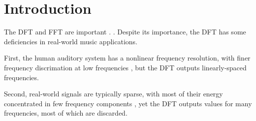 \documentclass[letter,12pt,notitlepage]{article}
\title{\ThesisTitle}
\author{\vspace{1em}\\Sevag Hanssian \\
  McGill University \\
 \small{\texttt{sevag.hanssian@mail.mcgill.ca}} \\
 \small{\texttt{sevagh@protonmail.com}} \\\ \\\ \\
 \small{Thesis for Master of Arts in Music Technology}\\
 \small{Date TBD, 2021}}
\date{}
\begin{document}
\maketitle

\vspace{3.5em}

\begin{abstract}
	The discrete Fourier transform (DFT), and the Fast Fourier Transform (FFT) algorithm for its efficient computation, rank among the most important algorithms in applied engineering and computer science in the modern world. The FFT is used in digital signal processing applications such as audio, seismology, and medical imaging to decompose a signal into a sum of its frequency components. This thesis first describes the DFT and FFT, their use in music systems, and several variants which may be beneficial for music applications. Next, a new software library is proposed which implements the FFT variants with an interface designed to be a drop-in replacement of the standard FFT. Finally, the variants are substituted in two recent state-of-the-art music systems, showing reduced computational footprint and an improvement in accuracy.
\end{abstract}

\vfill
\clearpage %

\tableofcontents

\vfill
\clearpage %

\listoffigures

\listoflistings

\vfill
\clearpage %

\section{Introduction}
\label{sec:intro}


The DFT and FFT \cite{cooleytukey} are important \cite{dftimportant}. . Despite its importance, the DFT has some deficiencies in real-world music applications.

First, the human auditory system has a nonlinear frequency resolution, with finer frequency discrimation at low frequencies , but the DFT outputs linearly-spaced frequencies.

Second, real-world signals are typically sparse, with most of their energy concentrated in few frequency components \cite{sparseintro}, yet the DFT outputs values for many frequencies, most of which are discarded.
\end{document}
